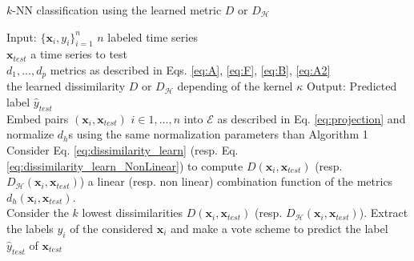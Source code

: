 \begin{algorithm}[h!]
	\begin{algorithmic}[1]
		\caption{$k$-NN classification using the learned metric $D$ or $D_{\mathcal{H}}$}
		\STATE Input:  
		$\{\textbf{x}_i, y_i\}_{i=1}^n$ $n$ labeled time series \\
		\hspace{1.1cm} $\textbf{x}_{test}$ a time series to test \\
		\hspace{1.1cm} $d_1, ...,d_p$  metrics as described in Eqs. \ref{eq:A}, \ref{eq:F}, \ref{eq:B}, \ref{eq:A2} \\
		\hspace{1.1cm} the learned dissimilarity $D$ or $D_{\mathcal{H}}$ depending of the kernel $\kappa$
		\STATE Output: Predicted label $\hat{y}_{test}$
		 \\   
		Embed pairs $(\textbf{x}_i,\textbf{x}_{test})$ $i\in {1,...,n}$ into $\mathcal{E}$ as described in Eq. \ref{eq:projection} and normalize $d_h$s using the same normalization parameters than Algorithm 1
		 \\ 
		Consider Eq. \ref{eq:dissimilarity_learn} (resp. Eq. \ref{eq:dissimilarity_learn_NonLinear}) to compute $D(\textbf{x}_i,\textbf{x}_{test})$ (resp. $D_{\mathcal{H}}(\textbf{x}_i,\textbf{x}_{test})$) a linear (resp. non linear) combination function of the metrics $d_h(\textbf{x}_i,\textbf{x}_{test})$.
		 \\
		Consider the $k$ lowest dissimilarities $D(\textbf{x}_i,\textbf{x}_{test})$ (resp. $D_{\mathcal{H}}(\textbf{x}_i,\textbf{x}_{test})$). Extract the labels $y_i$ of the considered $\textbf{x}_i$ and make a vote scheme to predict the label $\hat{y}_{test}$ of $\textbf{x}_{test}$
	\end{algorithmic}
\end{algorithm}


